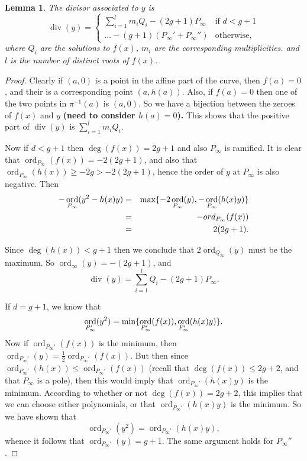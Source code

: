 \documentclass[11pt]{article} %
\newtheorem{lem}{Lemma}
\theoremstyle{remark}\newtheorem*{rem}{Remark}
\DeclareMathOperator{\ord}{ord}
\DeclareMathOperator{\di}{div}
\begin{document}
 
 \begin{lem}
  The divisor associated to $y$ is 
  \[
   \di (y) = \left\{ 
   \begin{array}{ll}
   \sum_{i=1}^l m_i Q_i - (2g+1)P_\infty & \mbox{if } d<g+1 \\
    \ldots -(g+1)(P_\infty' + P_\infty'') & \mbox{otherwise},
   \end{array}\right.
 \]
 where $Q_i$ are the solutions to $f(x)$, $m_i$ are the corresponding multiplicities. and $l$ is the number of distinct roots of $f(x)$. 
 \end{lem}
\begin{proof}
Clearly if $(a,0)$ is a point in the affine part of the curve, then $f(a) = 0$, and their is a corresponding point $(a,h(a))$. 
Also, if $f(a) = 0$ then one of the two points in $\pi^{-1}(a)$ is $(a,0)$.
So we have a bijection between the zeroes of $f(x)$ and $y$ {\bf (need to consider $h(a)=0$).}
This shows that the positive part of $\di (y)$ is $\sum_{i=1}^l m_i Q_i$.

Now if $d<g+1$ then $\deg(f(x)) = 2g+1$ and also $P_\infty$ is ramified.
It is clear that $\ord_{P_\infty}(f(x)) = -2(2g+1)$, and also that $\ord_{P_\infty}(h(x))\geq-2g>-2(2g+1)$, hence the order of $y$ at $P_\infty$ is also negative.
Then 
\begin{eqnarray*}
 -\ord_{P_{\infty}}(y^2-h(x)y) & = & {\rm max}\{ -2\ord_{P_{\infty}}(y),-\ord_{P_{\infty}}(h(x)y) \}\\
 & = & -ord_{P_\infty}(f(x)) \\
 & = & 2(2g+1).
\end{eqnarray*}

 Since $\deg(h(x))< g+1$ then we conclude that $2\ord_{Q_{\infty}}(y)$ must be the maximum.
 So $\ord_{\infty}(y) = -(2g+1)$, and 
 \[
  \di(y) =\sum_{i=1}^l Q_i - (2g+1)P_{\infty}.
  \]

 
If $d=g+1$, we know that 
\[
 \ord_{P_\infty'}(y^2)={\rm min} \{\ord_{P_\infty'}(f(x)),\ord_{P_\infty'}(h(x)y)\}.
\]
Now if $\ord_{P_\infty'}(f(x))$ is the minimum, then $\ord_{P_\infty'}(y)=\frac{1}{2}\ord_{P_\infty'}(f(x))$.
But then since $\ord_{P_\infty'}(h(x)) \leq \ord_{P_\infty'}(f(x))$ (recall that $\deg(f(x)) \leq 2g+2$, and that $P_\infty$ is a pole), then this would imply that $\ord_{P_\infty'}(h(x)y)$ is the minimum.
According to whether or not $\deg(f(x))=2g+2$, this implies that we can choose either polynomials, or that $\ord_{P_\infty'}(h(x)y)$ is the minimum.
So we have shown that
\[
 \ord_{P_\infty'}(y^2)=\ord_{P_\infty'}(h(x)y),
\]
whence it follows that $\ord_{P_\infty'}(y)=g+1$.
The same argument holds for $P_\infty''$.


\end{proof}
\end{document}

